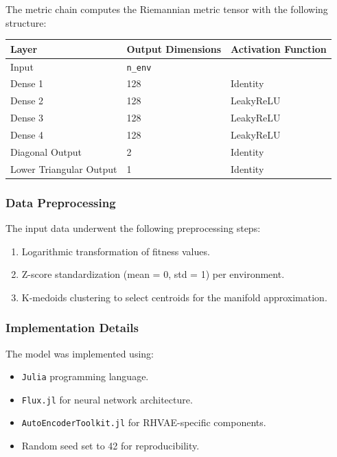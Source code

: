 \documentclass[
]{scrartcl}
\begin{document}
\begin{refsection}
The metric chain computes the Riemannian metric tensor with the
following structure:

\begin{longtable}[]{@{}lll@{}}
\toprule\noalign{}
Layer & Output Dimensions & Activation Function \\
\midrule\noalign{}
\endhead
\bottomrule\noalign{}
\endlastfoot
Input & \texttt{n\_env} & \\
Dense 1 & 128 & Identity \\
Dense 2 & 128 & LeakyReLU \\
Dense 3 & 128 & LeakyReLU \\
Dense 4 & 128 & LeakyReLU \\
Diagonal Output & 2 & Identity \\
Lower Triangular Output & 1 & Identity \\
\end{longtable}

\subsubsection{Data Preprocessing}\label{data-preprocessing}

The input data underwent the following preprocessing steps:

\begin{enumerate}
\def\labelenumi{\arabic{enumi}.}
\item
  Logarithmic transformation of fitness values.
\item
  Z-score standardization (mean = 0, std = 1) per environment.
\item
  K-medoids clustering to select centroids for the manifold
  approximation.
\end{enumerate}

\subsubsection{Implementation Details}\label{implementation-details-1}

The model was implemented using:

\begin{itemize}
\item
  \texttt{Julia} programming language.
\item
  \texttt{Flux.jl} for neural network architecture.
\item
  \texttt{AutoEncoderToolkit.jl} for RHVAE-specific components.
\item
  Random seed set to 42 for reproducibility.
\end{itemize}


\end{refsection}
\end{document}
